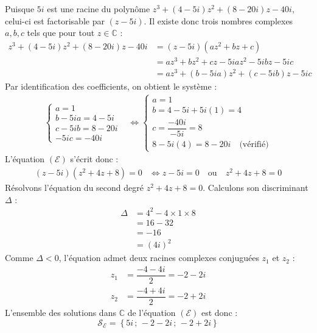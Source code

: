\documentclass[12pt,a4paper]{article}
\begin{document}
\begin{enumerate}
    Puisque $5i$ est une racine du polynôme $z^3 + (4 - 5i)z^2 + (8 - 20i)z - 40i$, celui-ci est factorisable par $(z - 5i)$. Il existe donc trois nombres complexes $a, b, c$ tels que pour tout $z \in \mathbb{C}$ :
    $$
    \begin{aligned}
        z^3 + (4 - 5i)z^2 + (8 - 20i)z - 40i &= (z - 5i)(az^2 + bz + c) \\
        &= az^3 + bz^2 + cz - 5iaz^2 - 5ibz - 5ic \\
        &= az^3 + (b - 5ia)z^2 + (c - 5ib)z - 5ic
    \end{aligned}
    $$
    Par identification des coefficients, on obtient le système :
    $$
    \begin{aligned}
        \left\{
        \begin{array}{l}
            a = 1 \\
            b - 5ia = 4 - 5i \\
            c - 5ib = 8 - 20i \\
            -5ic = -40i
        \end{array}
        \right.
        &\iff
        \left\{
        \begin{array}{l}
            a = 1 \\
            b = 4 - 5i + 5i(1) = 4 \\
            c = \dfrac{-40i}{-5i} = 8 \\
            8 - 5i(4) = 8 - 20i \quad \text{(vérifié)}
        \end{array}
        \right.
    \end{aligned}
    $$
    L'équation $(\mathcal{E})$ s'écrit donc :
    $$
    \begin{aligned}
        (z - 5i)(z^2 + 4z + 8) = 0 &\iff z - 5i = 0 \quad \text{ou} \quad z^2 + 4z + 8 = 0
    \end{aligned}
    $$
    Résolvons l'équation du second degré $z^2 + 4z + 8 = 0$. Calculons son discriminant $\Delta$ :
    $$
    \begin{aligned}
        \Delta &= 4^2 - 4 \times 1 \times 8 \\
        &= 16 - 32 \\
        &= -16 \\
        &= (4i)^2
    \end{aligned}
    $$
    Comme $\Delta < 0$, l'équation admet deux racines complexes conjuguées $z_1$ et $z_2$ :
    $$
    \begin{aligned}
        z_1 &= \dfrac{-4 - 4i}{2} = -2 - 2i \\
        z_2 &= \dfrac{-4 + 4i}{2} = -2 + 2i
    \end{aligned}
    $$
    L'ensemble des solutions dans $\mathbb{C}$ de l'équation $(\mathcal{E})$ est donc :
    $$
    \mathcal{S}_{\mathcal{E}} = \left\{ 5i \,;\, -2 - 2i \,;\, -2 + 2i \right\}
    $$
\end{enumerate}
\end{document}
